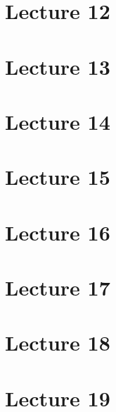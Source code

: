 \documentclass{report}
\begin{document}
\chapter{Lecture 12}


\chapter{Lecture 13}


\chapter{Lecture 14}


\chapter{Lecture 15}


\chapter{Lecture 16}


\chapter{Lecture 17}


\chapter{Lecture 18}


\chapter{Lecture 19}

\end{document}
